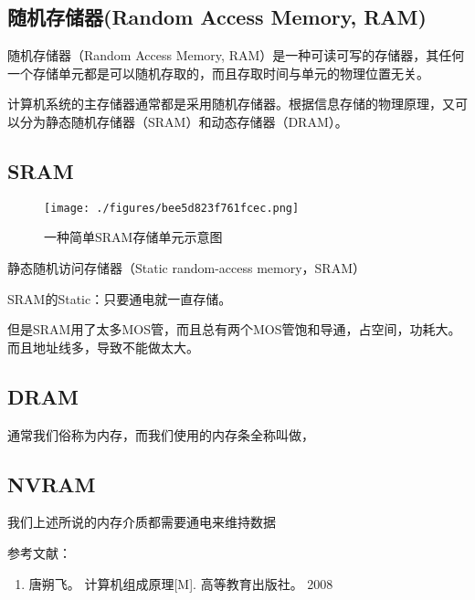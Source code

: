 
\begin{issues}
\issueDraft
\end{issues}

\subsection{随机存储器(Random Access Memory, RAM)}

随机存储器（Random Access Memory, RAM）是一种可读可写的存储器，其任何一个存储单元都是可以随机存取的，而且存取时间与单元的物理位置无关。

计算机系统的主存储器通常都是采用随机存储器。根据信息存储的物理原理，又可以分为静态随机存储器（SRAM）和动态存储器（DRAM）。


\subsection{SRAM}

\begin{figure}[ht]
\centering
\texttt{[image: ./figures/bee5d823f761fcec.png]}
\caption{一种简单SRAM存储单元示意图} \label{fig_RAM_2}
\end{figure}

静态随机访问存储器（Static random-access memory，SRAM）


SRAM的Static：只要通电就一直存储。

但是SRAM用了太多MOS管，而且总有两个MOS管饱和导通，占空间，功耗大。而且地址线多，导致不能做太大。

\subsection{DRAM}

通常我们俗称为内存，而我们使用的内存条全称叫做，


\subsection{NVRAM}

我们上述所说的内存介质都需要通电来维持数据



参考文献：
\begin{enumerate}
\item 唐朔飞。 计算机组成原理[M]. 高等教育出版社。 2008
\end{enumerate}
